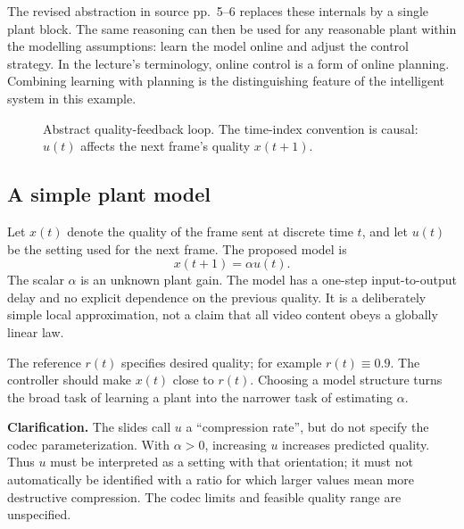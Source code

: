 \documentclass[11pt,a4paper]{article}
\numberwithin{equation}{section}
\numberwithin{figure}{section}
\numberwithin{table}{section}
\newcommand{\clarify}[1]{\par\textbf{Clarification.} #1\par}
\begin{document}
The revised abstraction in source pp.\ 5--6 replaces these internals by a single plant block. The same reasoning can then be used for any reasonable plant within the modelling assumptions: learn the model online and adjust the control strategy. In the lecture's terminology, online control is a form of online planning. Combining learning with planning is the distinguishing feature of the intelligent system in this example.
\begin{figure}[htbp]\centering
{}
\caption{Abstract quality-feedback loop. The time-index convention is causal: $u(t)$ affects the next frame's quality $x(t+1)$.}
\label{fig:abstract}
\end{figure}
\FloatBarrier

\subsection{A simple plant model}
Let $x(t)$ denote the quality of the frame sent at discrete time $t$, and let $u(t)$ be the setting used for the next frame. The proposed model is
\begin{equation}\label{eq:plant}x(t+1)=\alpha u(t).\end{equation}
The scalar $\alpha$ is an unknown plant gain. The model has a one-step input-to-output delay and no explicit dependence on the previous quality. It is a deliberately simple local approximation, not a claim that all video content obeys a globally linear law.

The reference $r(t)$ specifies desired quality; for example $r(t)\equiv0.9$. The controller should make $x(t)$ close to $r(t)$. Choosing a model structure turns the broad task of learning a plant into the narrower task of estimating $\alpha$.

\clarify{The slides call $u$ a ``compression rate'', but do not specify the codec parameterization. With $\alpha>0$, increasing $u$ increases predicted quality. Thus $u$ must be interpreted as a setting with that orientation; it must not automatically be identified with a ratio for which larger values mean more destructive compression. The codec limits and feasible quality range are unspecified.}
\end{document}
